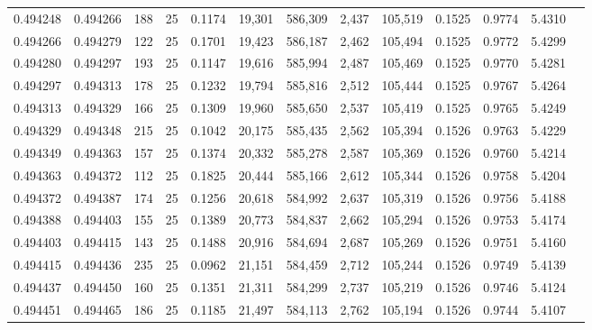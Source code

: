 \begin{tabular}{rrrrrrrrrrrrr}
0.494248 & 0.494266 & 188 &  25 &                                     0.1174 &  19,301 & 586,309 &   2,437 & 105,519 & 0.1525 & 0.9774 & 5.4310 \\
0.494266 & 0.494279 & 122 &  25 &                                     0.1701 &  19,423 & 586,187 &   2,462 & 105,494 & 0.1525 & 0.9772 & 5.4299 \\
0.494280 & 0.494297 & 193 &  25 &                                     0.1147 &  19,616 & 585,994 &   2,487 & 105,469 & 0.1525 & 0.9770 & 5.4281 \\
0.494297 & 0.494313 & 178 &  25 &                                     0.1232 &  19,794 & 585,816 &   2,512 & 105,444 & 0.1525 & 0.9767 & 5.4264 \\
0.494313 & 0.494329 & 166 &  25 &                                     0.1309 &  19,960 & 585,650 &   2,537 & 105,419 & 0.1525 & 0.9765 & 5.4249 \\
0.494329 & 0.494348 & 215 &  25 &                                     0.1042 &  20,175 & 585,435 &   2,562 & 105,394 & 0.1526 & 0.9763 & 5.4229 \\
0.494349 & 0.494363 & 157 &  25 &                                     0.1374 &  20,332 & 585,278 &   2,587 & 105,369 & 0.1526 & 0.9760 & 5.4214 \\
0.494363 & 0.494372 & 112 &  25 &                                     0.1825 &  20,444 & 585,166 &   2,612 & 105,344 & 0.1526 & 0.9758 & 5.4204 \\
0.494372 & 0.494387 & 174 &  25 &                                     0.1256 &  20,618 & 584,992 &   2,637 & 105,319 & 0.1526 & 0.9756 & 5.4188 \\
0.494388 & 0.494403 & 155 &  25 &                                     0.1389 &  20,773 & 584,837 &   2,662 & 105,294 & 0.1526 & 0.9753 & 5.4174 \\
0.494403 & 0.494415 & 143 &  25 &                                     0.1488 &  20,916 & 584,694 &   2,687 & 105,269 & 0.1526 & 0.9751 & 5.4160 \\
0.494415 & 0.494436 & 235 &  25 &                                     0.0962 &  21,151 & 584,459 &   2,712 & 105,244 & 0.1526 & 0.9749 & 5.4139 \\
0.494437 & 0.494450 & 160 &  25 &                                     0.1351 &  21,311 & 584,299 &   2,737 & 105,219 & 0.1526 & 0.9746 & 5.4124 \\
0.494451 & 0.494465 & 186 &  25 &                                     0.1185 &  21,497 & 584,113 &   2,762 & 105,194 & 0.1526 & 0.9744 & 5.4107 \\

\end{tabular}
